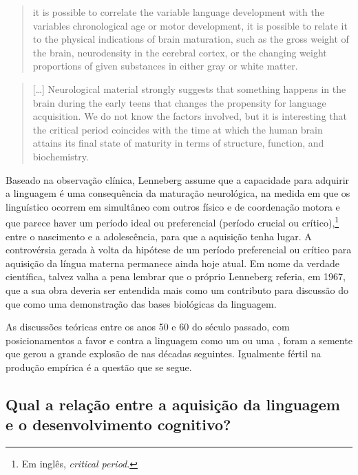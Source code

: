 \documentclass[output=paper]{LSP/langsci}
\begin{document}
\begin{quote}
it is possible to correlate the variable language development with the variables chronological age or motor development, it is possible to relate it to the physical indications of brain maturation, such as the gross weight of the brain, neurodensity in the cerebral cortex, or the changing weight proportions of given substances in either gray or white matter. \citep[635]{lenneberg1969}

\end{quote}

\begin{quote}
[\ldots] Neurological material strongly suggests that something happens in the brain during the early teens that changes the propensity for language acquisition. We do not know the factors involved, but it is interesting that the critical period coincides with the time at which the human brain attains its final state of maturity in terms of structure, function, and biochemistry. \citep[639]{lenneberg1969}
\end{quote}

Baseado na observação clínica, Lenneberg assume que a capacidade para adquirir a linguagem é uma consequência da maturação neurológica, na medida em que os  linguístico ocorrem em simultâneo com outros  físico e de coordenação motora e que parece haver um período ideal ou preferencial (período crucial ou crítico),\footnote{Em inglês, \textit{critical period}.} entre o nascimento e a adolescência, para que a aquisição tenha lugar. A controvérsia gerada à volta da hipótese de um período preferencial ou crítico para aquisição da língua materna permanece ainda hoje atual. Em nome da verdade científica, talvez valha a pena lembrar que o próprio Lenneberg referia, em 1967, que a sua obra deveria ser entendida mais como um contributo para discussão do que como uma demonstração das bases biológicas da linguagem. 

As discussões teóricas entre os anos 50 e 60 do século passado, com posicionamentos a favor e contra a linguagem como um  ou uma , foram a semente que gerou a grande explosão de  nas décadas seguintes. Igualmente fértil na produção empírica é a questão que se segue. 

\subsection{Qual a relação entre a aquisição da linguagem e o desenvolvimento cognitivo?}
\label{subsec:simsim_relacao}
\end{document}
